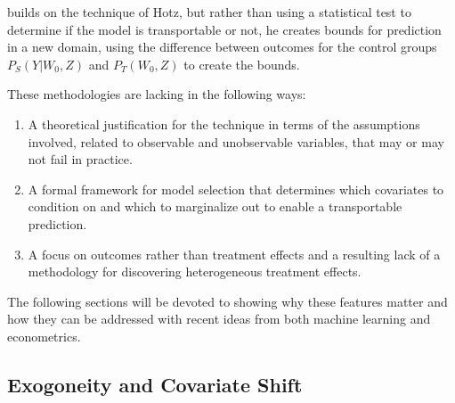 \documentclass[a4paper,12pt]{article}
\begin{document}
\cite{Gechter2015} builds on the technique of Hotz, but rather than using a statistical test to determine if the model is transportable or not, he creates bounds for prediction in a new domain, using the difference between outcomes for the control groups $P_S(Y|W_0, Z)$ and  $P_T(W_0, Z)$ to create the bounds. 

These methodologies are lacking in the following ways: 

\begin{enumerate}
\item A theoretical justification for the technique in terms of the assumptions involved, related to observable and unobservable variables, that may or may not fail in practice. 
\item A formal framework for model selection that determines which covariates to condition on and which to marginalize out to enable a transportable prediction.
\item A focus on outcomes rather than treatment effects and a resulting lack of a methodology for discovering heterogeneous treatment effects.
\end{enumerate}

The following sections will be devoted to showing why these features matter and how they can be addressed with recent ideas from both machine learning and econometrics. 





\subsection{ Exogoneity and Covariate Shift}
\end{document}
